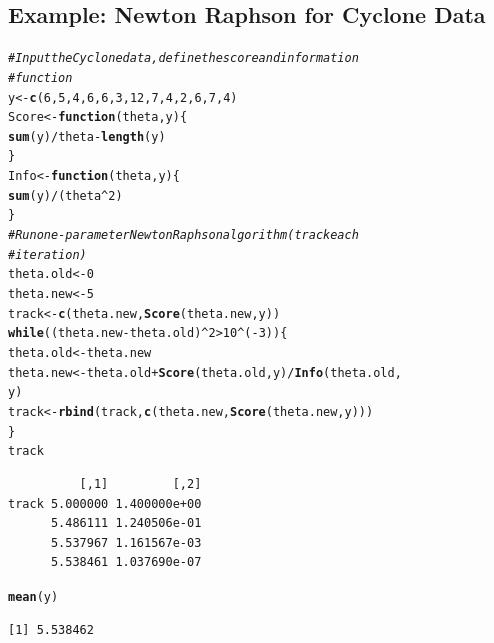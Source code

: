\documentclass[oneside]{book}\usepackage[]{graphicx}\usepackage[svgnames]{xcolor}
\makeatletter
\newcommand{\hlnum}[1]{\textcolor[rgb]{0.686,0.059,0.569}{#1}}%
\newcommand{\hlcom}[1]{\textcolor[rgb]{0.678,0.584,0.686}{\textit{#1}}}%
\newcommand{\hlopt}[1]{\textcolor[rgb]{0,0,0}{#1}}%
\newcommand{\hlstd}[1]{\textcolor[rgb]{0.345,0.345,0.345}{#1}}%
\newcommand{\hlkwa}[1]{\textcolor[rgb]{0.161,0.373,0.58}{\textbf{#1}}}%
\newcommand{\hlkwb}[1]{\textcolor[rgb]{0.69,0.353,0.396}{#1}}%
\newcommand{\hlkwc}[1]{\textcolor[rgb]{0.333,0.667,0.333}{#1}}%
\newcommand{\hlkwd}[1]{\textcolor[rgb]{0.737,0.353,0.396}{\textbf{#1}}}%
\newenvironment{kframe}{%
 \def\at@end@of@kframe{}%
 \ifinner\ifhmode%
  \def\at@end@of@kframe{\end{minipage}}%
  \begin{minipage}{\columnwidth}%
 \fi\fi%
 \def\FrameCommand##1{\hskip\@totalleftmargin \hskip-\fboxsep
 \colorbox{shadecolor}{##1}\hskip-\fboxsep
     \hskip-\linewidth \hskip-\@totalleftmargin \hskip\columnwidth}%
 \MakeFramed {\advance\hsize-\width
   \@totalleftmargin\z@ \linewidth\hsize
   \@setminipage}}%
 {\par\unskip\endMakeFramed%
 \at@end@of@kframe}
\newenvironment{knitrout}{}{} %
\makeatother
\begin{document}
\subsection*{Example: Newton Raphson for Cyclone Data}
\begin{knitrout}
\color{fgcolor}\begin{kframe}
\begin{alltt}
\hlcom{# Input the Cyclone data, define the score and information}
\hlcom{# function}
\hlstd{y} \hlkwb{<-} \hlkwd{c}\hlstd{(}\hlnum{6}\hlstd{,} \hlnum{5}\hlstd{,} \hlnum{4}\hlstd{,} \hlnum{6}\hlstd{,} \hlnum{6}\hlstd{,} \hlnum{3}\hlstd{,} \hlnum{12}\hlstd{,} \hlnum{7}\hlstd{,} \hlnum{4}\hlstd{,} \hlnum{2}\hlstd{,} \hlnum{6}\hlstd{,} \hlnum{7}\hlstd{,} \hlnum{4}\hlstd{)}
\hlstd{Score} \hlkwb{<-} \hlkwa{function}\hlstd{(}\hlkwc{theta}\hlstd{,} \hlkwc{y}\hlstd{) \{}
  \hlkwd{sum}\hlstd{(y)}\hlopt{/}\hlstd{theta} \hlopt{-} \hlkwd{length}\hlstd{(y)}
\hlstd{\}}
\hlstd{Info} \hlkwb{<-} \hlkwa{function}\hlstd{(}\hlkwc{theta}\hlstd{,} \hlkwc{y}\hlstd{) \{}
  \hlkwd{sum}\hlstd{(y)}\hlopt{/}\hlstd{(theta}\hlopt{^}\hlnum{2}\hlstd{)}
\hlstd{\}}
\hlcom{# Run one-parameter Newton Raphson algorithm (track each}
\hlcom{# iteration)}
\hlstd{theta.old} \hlkwb{<-} \hlnum{0}
\hlstd{theta.new} \hlkwb{<-} \hlnum{5}
\hlstd{track} \hlkwb{<-} \hlkwd{c}\hlstd{(theta.new,} \hlkwd{Score}\hlstd{(theta.new, y))}
\hlkwa{while} \hlstd{((theta.new} \hlopt{-} \hlstd{theta.old)}\hlopt{^}\hlnum{2} \hlopt{>} \hlnum{10}\hlopt{^}\hlstd{(}\hlopt{-}\hlnum{3}\hlstd{)) \{}
  \hlstd{theta.old} \hlkwb{<-} \hlstd{theta.new}
  \hlstd{theta.new} \hlkwb{<-} \hlstd{theta.old} \hlopt{+} \hlkwd{Score}\hlstd{(theta.old, y)}\hlopt{/}\hlkwd{Info}\hlstd{(theta.old,}
    \hlstd{y)}
  \hlstd{track} \hlkwb{<-} \hlkwd{rbind}\hlstd{(track,} \hlkwd{c}\hlstd{(theta.new,} \hlkwd{Score}\hlstd{(theta.new, y)))}
\hlstd{\}}
\hlstd{track}
\end{alltt}
\begin{verbatim}
          [,1]         [,2]
track 5.000000 1.400000e+00
      5.486111 1.240506e-01
      5.537967 1.161567e-03
      5.538461 1.037690e-07
\end{verbatim}
\begin{alltt}
\hlkwd{mean}\hlstd{(y)}
\end{alltt}
\begin{verbatim}
[1] 5.538462
\end{verbatim}
\end{kframe}
\end{knitrout}
\end{document}
